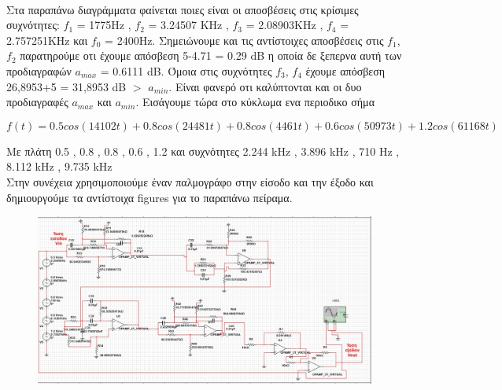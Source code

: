 \documentclass{article}
\begin{document}
{{\begin{figure}[h!]
\end{figure} \\
Στα παραπάνω διαγράμματα φαίνεται ποιες είναι οι αποσβέσεις στις κρίσιμες συχνότητες: $f_1$ = 1775Hz , $f_2$ = 3.24507 KHz , $f_3$ = 2.08903KHz , $f_4$ = 2.757251KHz και $f_0$ = 2400Hz. Σημειώνουμε και τις αντίστοιχες αποσβέσεις στις $f_1$, $f_2$ παρατηρούμε οτι έχουμε απόσβεση 5-4.71 = 0.29 dB η οποία δε ξεπερνα αυτή των προδιαγραφών $a_{max}$ = 0.6111 dB. Όμοια στις συχνότητες $f_3$, $f_4$ έχουμε απόσβεση 26,8953+5 = 31,8953 dB $>$ $a_{min}$. Είναι φανερό οτι καλύπτονται και οι δυο προδιαγραφές $a_{max}$ και $a_{min}$.
\clearpage
Εισάγουμε τώρα στο κύκλωμα ενα περιοδικο σήμα\begin{changemargin}{-2.5cm}{0.5cm}\begin{equation*}
\boxed{
f(t) =0.5 cos(14102t) + 0.8 cos(24481t) + 0.8cos(4461t) + 0.6cos(50973t) + 1.2cos(61168t) }
\end{equation*}
\end{changemargin}
Με πλάτη 0.5 , 0.8 , 0.8 , 0.6 , 1.2 και συχνότητες  2.244 kHz , 3.896 kHz , 710 Hz , 8.112 kHz , 9.735 kHz\\
Στην συνέχεια χρησιμοποιούμε έναν παλμογράφο στην είσοδο και την έξοδο και δημιουργούμε τα αντίστοιχα figures για το παραπάνω πείραμα.
\begin{figure}[h!]
\centering
 	\advance\leftskip-4cm
  \includegraphics[width=200mm,scale=2]{thema3/multisim5.jpg}
\end{figure} 

}}
\end{document}
